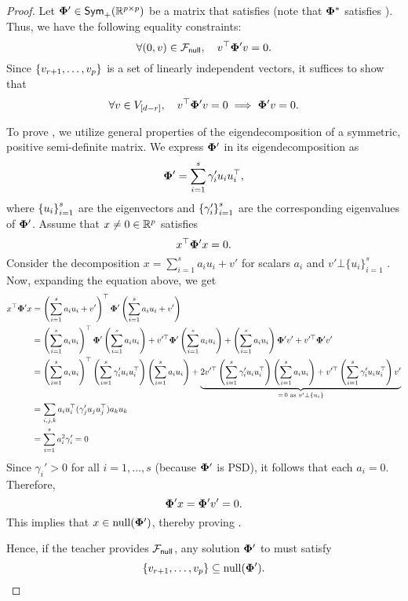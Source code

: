\begin{proof} Let $\boldsymbol{\Phi}' \in \textsf{Sym}_{+}(\mathbb{R}^{p\times p})$ be a matrix that satisfies  (note that $\boldsymbol{\Phi}^*$ satisfies ). Thus, we have the following equality constraints:
\begin{equation*}
       \forall (0, v) \in {\mathcal{F}}_{\textsf{null}}, \quad v^{\top} \boldsymbol{\Phi}' v = 0.
\end{equation*}
    Since $\left\{v_{r+1}, \ldots, v_p\right\}$ is a set of linearly independent vectors, it suffices to show that
    \begin{align}
        \forall v \in V_{\left[d - r\right]}, \quad v^{\top} \boldsymbol{\Phi}' v = 0 \implies \boldsymbol{\Phi}' v = 0. \label{eq: lemmain}
    \end{align}
    
    To prove , we utilize general properties of the eigendecomposition of a symmetric, positive semi-definite matrix. We express $\boldsymbol{\Phi}'$ in its eigendecomposition as
    \[
        \boldsymbol{\Phi}' = \sum_{i=1}^{s} \gamma_i' u_i u_i^{\top},
    \]
    where $\left\{u_i\right\}_{i=1}^{s}$ are the eigenvectors and $\left\{\gamma_i'\right\}_{i=1}^s$ are the corresponding eigenvalues of $\boldsymbol{\Phi}'$. Assume that $x \neq 0 \in \mathbb{R}^p$ satisfies
    \[
        x^{\top} \boldsymbol{\Phi}' x = 0.
    \]
    Consider the decomposition $x = \sum_{i=1}^s a_iu_i + v'$ for scalars $a_i$ and $v' \bot \{u_i\}_{i=1}^s$ . Now, expanding the equation above, we get
    \allowdisplaybreaks
    \begin{align*}
       x^{\top}\boldsymbol{\Phi}'x &=  \left( {\sum_{i=1}^s a_iu_i + v'} \right) ^{\top}\boldsymbol{\Phi}' \left( {\sum_{i=1}^s a_iu_i + v'} \right)   \\
       & =  \left( {\sum_{i=1}^s a_iu_i} \right) ^{\top}\boldsymbol{\Phi}' \left( {\sum_{i=1}^s a_iu_i } \right)  + v'^{\top}\boldsymbol{\Phi}' \left( {\sum_{i=1}^s a_iu_i} \right)  +  \left( {\sum_{i=1}^s a_iu_i} \right) \boldsymbol{\Phi}'v' + v'^{\top}\boldsymbol{\Phi}'v'\\
       & =  \left( {\sum_{i=1}^s a_iu_i} \right) ^{\top} \left( {\sum_{i = 1}^{s} \gamma_i'u_iu_i^{\top}} \right)  \left( {\sum_{i=1}^s a_iu_i } \right)  + \underbrace{2v'^{\top} \left( {\sum_{i = 1}^{s} \gamma_i'u_iu_i^{\top}} \right)  \left( {\sum_{i=1}^s a_iu_i} \right)  + v'^{\top} \left( {\sum_{i = 1}^{s} \gamma_i'u_iu_i^{\top}} \right) v'}_{ =\, 0 \textnormal{ as } v' \bot \left\{u_i\right\}} \\
       & = \sum_{i,j,k} a_i u_i^{\top} (\gamma_j'u_ju_j^{\top}) a_k u_k\\
       & = \sum_{i=1}^s a_i^2\gamma_i' = 0
    \end{align*}
    Since $\gamma_i' > 0$ for all $i = 1, \ldots, s$ (because $\boldsymbol{\Phi}'$ is PSD), it follows that each $a_i = 0$. Therefore,
    \[
        \boldsymbol{\Phi}' x = \boldsymbol{\Phi}' v' = 0.
    \]
    This implies that $x \in \mathrm{null}({\boldsymbol{\Phi}'})$, thereby proving .
    
    Hence, if the teacher provides ${\mathcal{F}}_{\textsf{null}}$, any solution $\boldsymbol{\Phi}'$ to  must satisfy
    \[
        \{v_{r+1}, \ldots, v_p\} \subseteq \mathrm{null}({\boldsymbol{\Phi}'}).
    \]
\end{proof}


